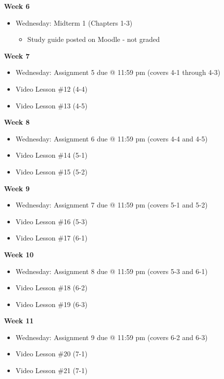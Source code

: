 \documentclass[12pt]{letter}
\newcommand{\?}{\stackrel{?}{=}}
\begin{document}
	\textbf{Week 6} \begin{itemize} \vspace{-12pt}
		\item Wednesday: Midterm 1 (Chapters 1-3) \begin{itemize}
			\item Study guide posted on Moodle - not graded
		\end{itemize}
	\end{itemize}

	\textbf{Week 7} \begin{itemize} \vspace{-12pt}
		\item Wednesday: Assignment 5 due @ 11:59 pm (covers 4-1 through 4-3)
		\item Video Lesson \#12 (4-4)
		\item Video Lesson \#13 (4-5)
	\end{itemize}

	\textbf{Week 8} \begin{itemize} \vspace{-12pt}
		\item Wednesday: Assignment 6 due @ 11:59 pm (covers 4-4 and 4-5)
		\item Video Lesson \#14 (5-1)
		\item Video Lesson \#15 (5-2)
	\end{itemize}

	\textbf{Week 9} \begin{itemize} \vspace{-12pt}
		\item Wednesday: Assignment 7 due @ 11:59 pm (covers 5-1 and 5-2)
		\item Video Lesson \#16 (5-3)
		\item Video Lesson \#17 (6-1)
	\end{itemize}
	
	\textbf{Week 10} \begin{itemize} \vspace{-12pt}
		\item Wednesday: Assignment 8 due @ 11:59 pm (covers 5-3 and 6-1)
		\item Video Lesson \#18 (6-2)
		\item Video Lesson \#19 (6-3)
	\end{itemize}

	\textbf{Week 11} \begin{itemize} \vspace{-12pt}
		\item Wednesday: Assignment 9 due @ 11:59 pm (covers 6-2 and 6-3)
		\item Video Lesson \#20 (7-1)
		\item Video Lesson \#21 (7-1)
	\end{itemize}
\end{document}
